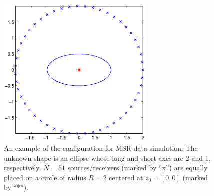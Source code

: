 \begin{figure}[htp]
  \centering
  \includegraphics[width=7.5cm]{dico/figures/fig1_ellipse_std}
  \caption{An example of the configuration for MSR data
    simulation. The unknown shape is an ellipse whose long and short
    axes are 2 and 1, respectively. $N=51$ sources/receivers (marked by
    ``x'') are equally placed on a circle of radius $R=2$ centered at
    $z_0=[0,0]$ (marked by ``*'').}
  \label{fig:data_acq}
\end{figure}

